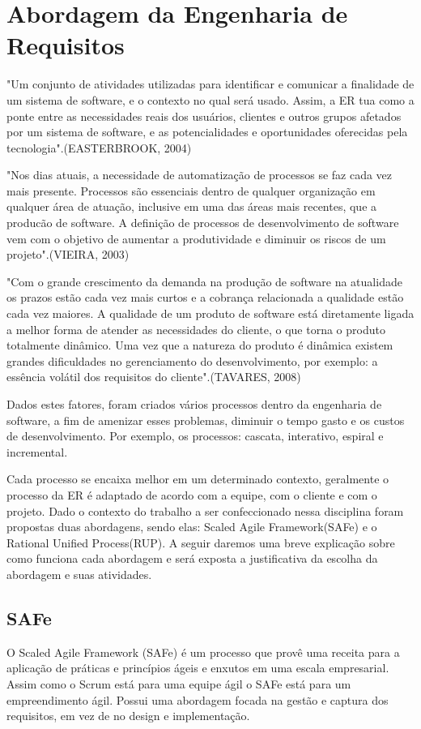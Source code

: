 \chapter[Abordagem da Engenharia de Requisitos]{Abordagem da Engenharia de Requisitos}
"Um conjunto de atividades utilizadas para identificar e comunicar a finalidade de um sistema de software, e o contexto no qual será usado. Assim, a ER tua como a ponte entre as necessidades reais dos usuários, clientes e outros grupos afetados por um sistema de software, e as potencialidades e oportunidades oferecidas pela tecnologia".(EASTERBROOK, 2004)

"Nos dias atuais, a necessidade de automatização de processos se faz cada vez mais presente. Processos são essenciais dentro de qualquer organização em qualquer área de atuação, inclusive em uma das áreas mais recentes, que a producão de software. A definição de processos de desenvolvimento de software vem com o objetivo de aumentar a produtividade e diminuir os riscos de um projeto".(VIEIRA, 2003)

"Com o grande crescimento da demanda na produção de software na atualidade os prazos estão cada vez mais curtos e a cobrança relacionada a qualidade estão cada vez maiores. A qualidade de um produto de software está diretamente ligada a melhor forma de atender as necessidades do cliente, o que torna o produto totalmente dinâmico. Uma vez que a natureza do produto é dinâmica existem grandes dificuldades no gerenciamento do desenvolvimento, por exemplo: a essência volátil dos requisitos do cliente".(TAVARES, 2008)

Dados estes fatores, foram criados vários processos dentro da engenharia de software, a fim de amenizar esses problemas, diminuir o tempo gasto e os custos de desenvolvimento. Por exemplo, os processos: cascata, interativo, espiral e incremental.

Cada processo se encaixa melhor em um determinado contexto, geralmente o processo da ER é adaptado de acordo com a equipe, com o cliente e com o projeto. Dado o contexto do trabalho a ser confeccionado nessa disciplina foram propostas duas abordagens, sendo elas: Scaled Agile Framework(SAFe) e o Rational Unified Process(RUP). A seguir daremos uma breve explicação sobre como funciona cada abordagem e será exposta a justificativa da escolha da abordagem e suas atividades.
  \section{SAFe}
O Scaled Agile Framework (SAFe) é um processo que provê uma receita para a aplicação de práticas e princípios ágeis e enxutos em uma escala empresarial. Assim como o Scrum está para uma equipe ágil o SAFe está para um empreendimento ágil. Possui uma abordagem focada na gestão e captura dos requisitos, em vez de no design e implementação.

